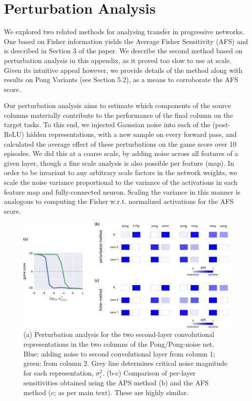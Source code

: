 \section{Perturbation Analysis}

We explored two related methods for analysing transfer in progressive networks.
One based on Fisher information yields the Average Fisher Sensitivity (AFS)
and is described in Section 3 of the paper. We describe
the second method based on perturbation analysis in this appendix, as it proved
too slow to use at scale. Given its intuitive appeal however, we provide
details of the method along with results on Pong Variants (see
Section 5.2), as a means to corroborate the AFS score.

Our perturbation analysis aims to estimate which components of the source
columns materially contribute to the performance of the final column on the
target tasks. To this end, we injected Gaussian noise into each of the (post-ReLU) hidden
representations, with a new sample on every forward pass, and calculated the
average effect of these perturbations on the game score over 10 episodes.  We
did this at a coarse scale, by adding noise across all features of a given
layer, though a fine scale analysis is also possible per feature (map).
In order to be invariant to any arbitrary scale factors in the network weights,
we scale the noise variance proportional to the variance of the activations in
each feature map and fully-connected neuron. Scaling the variance in this
manner is analogous to computing the Fisher w.r.t. normalized activations for
the AFS score.

\begin{figure}[h]
  \centering
    \includegraphics[width=.95\textwidth]{figures/appendix_AFS_vs_APS.pdf}
    \caption{(a) Perturbation analysis for the two second-layer
      convolutional representations in the two columns of the
      Pong/Pong-noise net. Blue: adding noise to second convolutional layer from column 1;
      green: from column 2. Grey line determines critical noise
      magnitude for each representation, $\sigma_i^2$.
      (b-c) Comparison of per-layer sensitivities obtained using the APS
      method (b) and the AFS method (c; as per main text).
      These are highly similar.}
    \label{fig:app_afs_vs_aps}
\end{figure}

